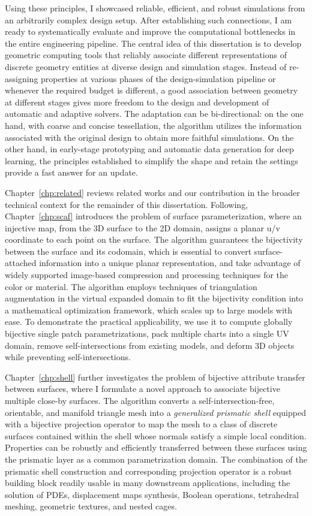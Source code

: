 Using these principles, I showcased reliable, efficient, and robust simulations from an arbitrarily complex design setup. After establishing such connections, I am ready to systematically evaluate and improve the computational bottlenecks in the entire engineering pipeline.
The central idea of this dissertation is to develop geometric computing tools that reliably associate different representations of discrete geometry entities at diverse design and simulation stages. 
Instead of re-assigning properties at various phases of the design-simulation pipeline or whenever the required budget is different, a good association between geometry at different stages gives more freedom to the design and development of automatic and adaptive solvers. The adaptation can be bi-directional: on the one hand, with coarse and concise tessellation, the algorithm utilizes the information associated with the original design to obtain more faithful simulations. On the other hand, in early-stage prototyping and automatic data generation for deep learning, the principles established to simplify the shape and retain the settings provide a fast answer for an update. 

Chapter~\ref*{chp:related} reviews related works and our contribution in the broader technical context for the remainder of this dissertation. 
Following, Chapter~\ref*{chp:scaf} introduces the problem of surface parameterization, where an injective map, from the 3D surface to the 2D domain, assigns a planar u/v coordinate to each point on the surface. The algorithm guarantees the bijectivity between the surface and its codomain, which is essential to convert surface-attached information into a unique planar representation, and take advantage of widely supported image-based compression and processing techniques for the color or material. 
The algorithm employs techniques of triangulation augmentation in the virtual expanded domain to fit the bijectivity condition into a mathematical optimization framework, which scales up to large models with ease. 
To demonstrate the practical applicability, we use it to compute globally bijective single patch parametrizations, pack multiple charts into a single UV domain, remove self-intersections from existing models, and deform 3D objects while preventing self-intersections.

Chapter~\ref*{chp:shell} further investigates the problem of bijective attribute transfer between surfaces, where I formulate a novel approach to associate bijective multiple close-by surfaces. The algorithm converts a self-intersection-free, orientable, and manifold triangle mesh into a \emph{generalized prismatic shell} equipped with a bijective projection operator to map the mesh to a class of discrete surfaces contained within the shell whose normals satisfy a simple local condition. 
Properties can be robustly and efficiently transferred between these surfaces using the prismatic layer as a common parametrization domain. 
The combination of the prismatic shell construction and corresponding projection operator is a robust building block readily usable in many downstream applications, including the solution of PDEs, displacement maps synthesis, Boolean operations, tetrahedral meshing, geometric textures, and nested cages.

